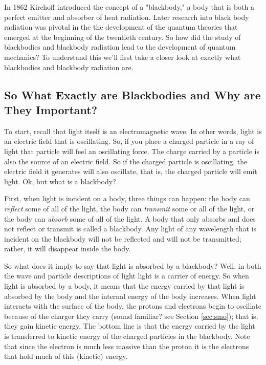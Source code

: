 \documentclass{article}
\theoremstyle{definition}
\begin{document}
\bigskip
\noindent
In 1862 Kirchoff introduced the concept of a "blackbody," a body
that is both a perfect emitter and absorber of heat
radiation. Later research into black body radiation was pivotal
in the the development of the quantum theories that emerged at
the beginning of the twentieth century. So how did the study of
blackbodies and blackbody radiation lead to the development of
quantum mechanics? To understand this we'll first take a closer
look at exactly what blackbodies and blackbody radiation are.

\subsection{So What Exactly are Blackbodies and Why are They Important?}
\label{subsec:black_bodies}
To start, recall that light itself is an electromagnetic wave.
In other words, light is an electric field that is oscillating.
So, if you place a charged particle in a ray of light that
particle will feel an oscillating force. The charge carried by a
particle is also the source of an electric field.  So if the
charged particle is oscillating, the electric field it generates
will also oscillate, that is, the charged particle will emit
light. Ok, but what is a blackbody?

\bigskip
\noindent
First, when light is incident on a body, three things can happen:
the body can \emph{reflect} some of all of the light, the body
can \emph{transmit} some or all of the light, or the body can
\emph{absorb} some of all of the light. A body that only absorbs
and does not reflect or transmit is called a blackbody. Any
light of any wavelength that is incident on the blackbody will
not be reflected and will not be transmitted; rather, it will
disappear inside the body.

\bigskip
\noindent
So what does it imply to say that light is absorbed by a
blackbody? Well, in both the wave and particle descriptions of
light light is a carrier of energy. So when light is absorbed by
a body, it means that the energy carried by that light is
absorbed by the body and the internal energy of the body
increases. When light interacts with the surface of the body, the
protons and electrons begin to oscillate because of the charger
they carry (sound familiar?  see Section \ref{sec:smo}); that is,
they gain kinetic energy. The bottom line is that the energy
carried by the light is transferred to kinetic energy of the
charged particles in the blackbody. Note that since the electron
is much less massive than the proton it is the electrons that
hold much of this (kinetic) energy.
\end{document}
